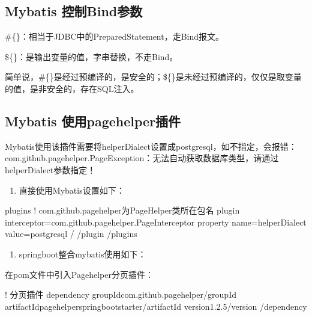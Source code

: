 \documentclass[a4,10pt,oneside,english]{sphinxmanual}
\begin{document}
\subsection{Mybatis 控制Bind参数}
\label{\detokenize{interface/mybatis:mybatis-bind}}
\#\{\}：相当于JDBC中的PreparedStatement，走Bind报文。

\$\{\}：是输出变量的值，字串替换，不走Bind。

简单说，\#\{\}是经过预编译的，是安全的；\$\{\}是未经过预编译的，仅仅是取变量的值，是非安全的，存在SQL注入。


\subsection{Mybatis 使用pagehelper插件}
\label{\detokenize{interface/mybatis:mybatis-pagehelper}}
Mybatis使用该插件需要将helperDialect设置成postgresql，如不指定，会报错：com.github.pagehelper.PageException：无法自动获取数据库类型，请通过helperDialect参数指定！
\begin{enumerate}
%
\item {} 
直接使用Mybatis设置如下：

\end{enumerate}

\begin{sphinxVerbatim}[commandchars=\\\{\}]
\PYGZlt{}plugins\PYGZgt{}
           \PYGZlt{}!\PYGZhy{}\PYGZhy{} com.github.pagehelper为PageHelper类所在包名 \PYGZhy{}\PYGZhy{}\PYGZgt{}
           \PYGZlt{}plugin interceptor=\PYGZdq{}com.github.pagehelper.PageInterceptor\PYGZdq{}\PYGZgt{}
                    \PYGZlt{}property name=\PYGZdq{}helperDialect\PYGZdq{} value=\PYGZdq{}postgresql\PYGZdq{} /\PYGZgt{}
           \PYGZlt{}/plugin\PYGZgt{}
\PYGZlt{}/plugins\PYGZgt{}
\end{sphinxVerbatim}
\begin{enumerate}
%
\setcounter{enumi}{1}
\item {} 
springboot整合mybatis使用如下：

\end{enumerate}

在pom文件中引入Pagehelper分页插件：

\begin{sphinxVerbatim}[commandchars=\\\{\}]
\PYGZlt{}!\PYGZhy{}\PYGZhy{} 分页插件 \PYGZhy{}\PYGZhy{}\PYGZgt{}
\PYGZlt{}dependency\PYGZgt{}
    \PYGZlt{}groupId\PYGZgt{}com.github.pagehelper\PYGZlt{}/groupId\PYGZgt{}
    \PYGZlt{}artifactId\PYGZgt{}pagehelper\PYGZhy{}spring\PYGZhy{}boot\PYGZhy{}starter\PYGZlt{}/artifactId\PYGZgt{}
    \PYGZlt{}version\PYGZgt{}1.2.5\PYGZlt{}/version\PYGZgt{}
\PYGZlt{}/dependency\PYGZgt{}
\end{sphinxVerbatim}
\end{document}
